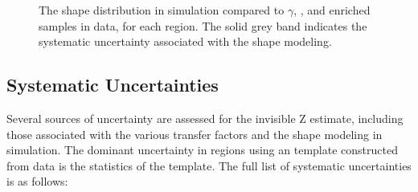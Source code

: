 \begin{figure}
	\renewcommand{\baselinestretch}{1.0}
	\caption[The \mttwo shape distribution in \znunu simulation compared to $\gamma$, \wlnu, and \zll enriched samples in data, for each \HT region.]{The \mttwo shape distribution in \znunu simulation compared to $\gamma$, \wlnu, and \zll enriched samples in data, for each \HT region. The solid grey band indicates the systematic uncertainty associated with the \mttwo shape modeling.}
	\label{fig:zinvMt2Shape}
\end{figure}

\subsection{Systematic Uncertainties}
\label{subsec:zinvSyst}

Several sources of uncertainty are assessed for the invisible Z estimate, including those associated with the various transfer factors and the \mttwo shape modeling in simulation. The dominant uncertainty in regions using an \mttwo template constructed from data is the statistics of the template. The full list of systematic uncertainties is as follows:
